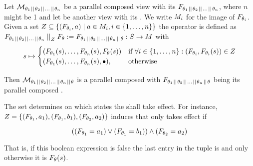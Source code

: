 \documentclass[preview]{standalone}
\begin{document}
\begin{definition}
	Let $\view[\viewppty_1 \pll \viewppty_2 \pll \dots \pll 
	\viewppty_n]$ be a parallel composed view with its \grpfctN $\grpfct[{\viewppty_1 \pll \viewppty_2 \pll \dots \pll \viewppty_n}]$, where $n$ might be 1 and let \view be another view with its \grpfctN \grpfct. 
	We write $\imggrp_i$ for the image of $\grpfct[\viewppty_i]$. 
	Given a set $\compselectset \subseteq \{ (\grpfct[\viewppty_i], a) \mid a \in \imggrp_i, i \in \{1, \dots, n\}\}$ the operator \compselectpure is defined as $\grpfct[{\viewppty_1 \pll \viewppty_2 \pll \dots \pll \viewppty_n}] \compselect \grpfct := \grpfct[{\viewppty_1 \pll \viewppty_2 \pll \dots \pll \viewppty_n} \pll \viewppty]: \states \to \arbset$ with
	\[
	\state \mapsto
	\begin{cases}
		(\grpfct[\viewppty_1](\state), \dots, \grpfct[\viewppty_n](\state),  \grpfct[\viewppty](\state))				& \text{if } \forall i \in \{1, \dots, n\} : (\grpfct[\viewppty_i], \grpfct[\viewppty_i](\state)) \in \compselectset \\ 		
		(\grpfct[\viewppty_1](\state), \dots, \grpfct[\viewppty_n](\state),  \remelem),          	& \text{otherwise}
	\end{cases}
	\]
	
	\noindent
	Then $\view[\viewppty_1 \pll \viewppty_2 \pll \dots \pll 
	\viewppty_n \pll \viewppty]$ is a parallel composed \viewN with $\grpfct[{\viewppty_1 \pll \viewppty_2 \pll \dots \pll \viewppty_n} \pll \viewppty]$ being its parallel composed \grpfctN.
\end{definition}

The set \compselectset determines on which states the \viewN \view shall take effect. For instance, $\compselectset = \{(\grpfct[\viewppty_1], a_1),(\grpfct[\viewppty_1], b_1), (\grpfct[\viewppty_2], a_2)\}$ induces that \view only takes effect if 

\[
	((\grpfct[\viewppty_1] = a_1) \lor (\grpfct[\viewppty_1] = b_1)) \land (\grpfct[\viewppty_2] = a_2)
\]

That is, if this boolean expression is false the last entry in the tuple is \remelem and only otherwise it is $\grpfct(\state)$.
\end{document}
